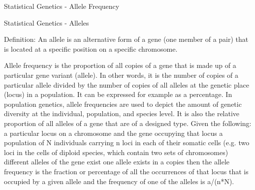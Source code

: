  
Statistical Genetics - Allele Frequency
 
 Statistical Genetics - Alleles
 
Definition: An allele is an alternative form of a gene (one member of a pair) that is located at a specific position on a specific chromosome.



Allele frequency is the proportion of all copies of a gene that is made up of a particular gene variant (allele). In other words, it is the number of copies of a particular allele divided by the number of copies of all alleles at the genetic place (locus) in a population. It can be expressed for example as a percentage. In population genetics, allele frequencies are used to depict the amount of genetic diversity at the individual, population, and species level. It is also the relative proportion of all alleles of a gene that are of a designed type.
Given the following:
a particular locus on a chromosome and the gene occupying that locus
a population of N individuals carrying n loci in each of their somatic cells (e.g. two loci in the cells of diploid species, which contain two sets of chromosomes)
different alleles of the gene exist
one allele exists in a copies
then the allele frequency is the fraction or percentage of all the occurrences of that locus that is occupied by a given allele and the frequency of one of the alleles is a/(n*N).

